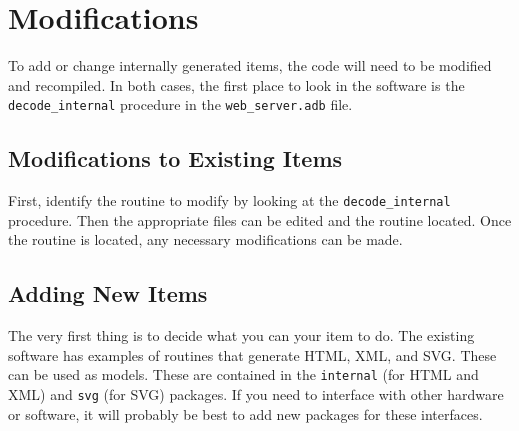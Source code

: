 \documentclass[10pt, openany, draft]{article}
\begin{document}
\section{Modifications}
To add or change internally generated items, the code will need to be modified and recompiled.  In both cases, the first place to look in the software is the \texttt{decode\_internal} procedure in the \texttt{web\_server.adb} file.

\subsection{Modifications to Existing Items}
First, identify the routine to modify by looking at the \texttt{decode\_internal} procedure.  Then the appropriate files can be edited and the routine located.  Once the routine is located, any necessary modifications can be made.

\subsection{Adding New Items}
The very first thing is to decide what you can your item to do.  The existing software has examples of routines that generate HTML, XML, and SVG.  These can be used as models.  These are contained in the \texttt{internal} (for HTML and XML) and \texttt{svg} (for SVG) packages.  If you need to interface with other hardware or software, it will probably be best to add new packages for these interfaces.
\end{document}
